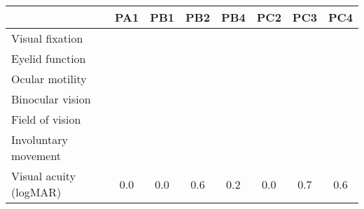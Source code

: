 
\small
\sffamily
\let\oldarraystretch\arraystretch
\renewcommand{\arraystretch}{2}
\newcommand{\skill}{\cellcolor{lightgray}}
\newcommand{\noskill}{\cellcolor{accent1}\textcolor{muteblack}{\BigCross}}
\newcommand{\snoskill}{\cellcolor{accent2}\textcolor{muteblack}{\BigDiamondshape}}

\begin{tabularx}{\linewidth}{|X|ccccccc|}
  \hline
                          & PA1      & PB1      & PB2       & PB4      & PC2       & PC3       & PC4 \\ \hline
  Visual fixation         & \noskill & \noskill & \noskill  & \noskill & \noskill  & \noskill  & \noskill \\
  Eyelid function         & \skill   & \skill   & \skill    & \skill   &  \skill  & \noskill  & \noskill \\
  Ocular motility         & \skill   & \noskill & \skill    & \noskill & \snoskill & \snoskill & \noskill\\
  Binocular vision        & \skill   & \skill   & \skill    & \skill   & \noskill  & \snoskill & \snoskill \\
  Field of vision         & \skill   & \skill   & \skill    & \skill   & \skill    & \noskill  & \noskill \\
  Involuntary movement    & \skill   & \noskill & \snoskill  & \noskill &  \noskill  & \noskill  & \skill \\ \hline
  Visual acuity (logMAR)  & 0.0      & 0.0      & 0.6       & 0.2      & 0.0       & 0.7  & 0.6\\
  \hline
\end{tabularx}

